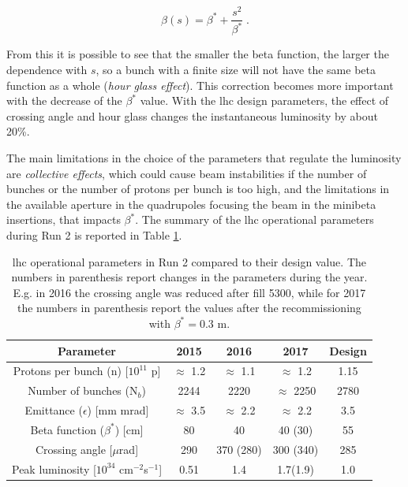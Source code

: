 \begin{equation}
\beta(s) = \beta^* + \frac{s^2}{\beta^*} \; .
\end{equation}

From this it is possible to see that the smaller the beta function, the larger the dependence with $s$, so a bunch with a finite size will not have the same beta function as a whole (\textit{hour glass effect}). This correction becomes more important with the decrease of the $\beta^*$ value. With the \gls{lhc} design parameters, the effect of crossing angle and hour glass changes the instantaneous luminosity by about 20\%.

The main limitations in the choice of the parameters that regulate the luminosity are \textit{collective effects}, which could cause beam instabilities if the number of bunches or the number of protons per bunch is too high, and the limitations in the available aperture in the
quadrupoles focusing the beam in the minibeta insertions, that impacts $\beta^*$. The summary of the \gls{lhc} operational parameters during Run 2 is reported in Table \ref{tab:lhc:param}.


\begin{table}[ht]
\begin{center}
\begin{tabular}{c c c c c }
\hline 
Parameter & 2015 & 2016 & 2017 & Design \\ 
\hline 
\hline
Protons per bunch (n) [$10^{11}$ p] & $\approx$ 1.2 & $\approx$ 1.1 & $\approx$ 1.2 & 1.15 \\ 
\hline 
Number of bunches (N$_b$) & 2244 & 2220 & $\approx$ 2250 & 2780 \\ 
\hline 
Emittance ($\epsilon$) [mm mrad] & $\approx$ 3.5 & $\approx$ 2.2 & $\approx$ 2.2 & 3.5 \\ 
\hline 
Beta function ($\beta^*$) [cm] & 80 & 40 & 40 (30) & 55 \\
\hline
Crossing angle [$\mu$rad] & 290 & 370 (280) & 300 (340) & 285 \\
\hline
Peak luminosity [$10^{34}$ cm$^{-2}$s$^{-1}$] & 0.51 & 1.4 & 1.7(1.9) & 1.0 \\
\hline
\end{tabular}
\end{center}
\caption{\gls{lhc} operational parameters in Run 2 compared to their design value.
The numbers in parenthesis report changes in the parameters during the year. 
E.g. in 2016 the crossing angle was reduced after fill 5300,
while for 2017 the numbers in parenthesis report the values 
after the recommissioning with $\beta^* = 0.3$ m.}
\label{tab:lhc:param}
\end{table}


